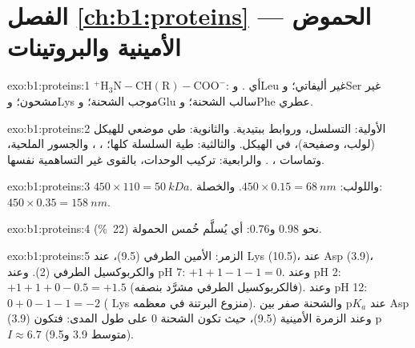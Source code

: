 \section*{الفصل \ref{ch:b1:proteins} --- الحموض الأمينية والبروتينات}

\begin{solution}{exo:b1:proteins:1}
$\mathrm{^+H_3N{-}CH(R){-}COO^-}$: أي . وLeu غير
 أليفاتي؛ وSer  غير مشحون؛ وLys موجب الشحنة؛ وGlu سالب
الشحنة؛ وPhe عطري.
\end{solution}

\begin{solution}{exo:b1:proteins:2}
الأولية: التسلسل، وروابط ببتيدية. والثانوية: طي موضعي للهيكل (لولب،
وصفيحة)،  في الهيكل. والثالثية: طية السلسلة كلها؛
، ، والجسور الملحية، وتماسات
، . والرابعية: تركيب الوحدات،
بالقوى غير التساهمية نفسها.
\end{solution}

\begin{solution}{exo:b1:proteins:3}
$450\times 110 = \qty{50}{kDa}$. واللولب: $450\times 0.15 = \qty{68}{nm}$.
والخصلة: $450\times 0.35 = \qty{158}{nm}$.
\end{solution}

\begin{solution}{exo:b1:proteins:4}
نحو $0.98$ و$0.76$: أي يُسلَّم خُمس الحمولة (\qty{22}{\%}).
\end{solution}

\begin{solution}{exo:b1:proteins:5}
الزمر: الأمين الطرفي (9.5)،  عند Lys (10.5)،
 عند Asp (3.9)، والكربوكسيل الطرفي (2). وعند pH 7:
$+1 + 1 - 1 - 1 = 0$. وعند pH 2: $+1 + 1 + 0 - 0.5 = +1.5$
(فالكربوكسيل الطرفي مشرَّد بنصفه). وعند pH 12:
$0 + 0 - 1 - 1 = -2$ ( Lys منزوع البرتنة في معظمه). والشحنة صفر بين
p$K_a$ عند Asp (3.9) وعند الزمرة الأمينية (9.5)، حيث تكون الشحنة
$0$ على طول المدى: فتكون p$I \approx 6.7$ (متوسط 3.9 و9.5).
\end{solution}


